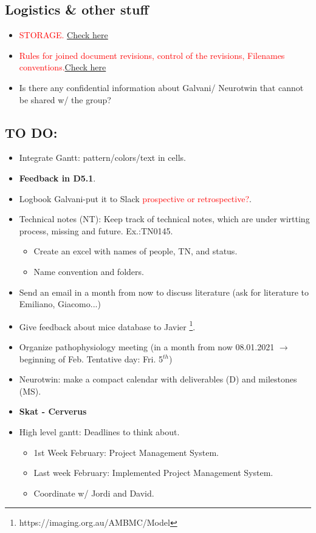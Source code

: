 \subsection{Logistics \&  other stuff}
\begin{itemize}
    \item \textcolor{red}{STORAGE.} \href{https://docs.google.com/document/d/16v9LeHPt3SFdeu1WQeSEbZKQP_1lh1sQ4h05umlxRZ4/edit}{Check here}
    \item \textcolor{red}{Rules for joined document revisions, control of the revisions, Filenames conventions.}\href{https://docs.google.com/document/d/1TGVl9pppeMySwDjRnmjSmvmIVzkaIl4oBJjY9_VCWMU/edit} {Check here}
     \item Is there any confidential information about Galvani/ Neurotwin that cannot be shared w/ the group?

   
\end{itemize}

\subsection{TO DO:}
\begin{itemize}
   \item Integrate Gantt: pattern/colors/text in cells.
    \item \textbf{Feedback in D5.1}.
    \item Logbook Galvani-put it to Slack \textcolor{red}{prospective or retrospective?}.
    \item Technical notes (NT): Keep track of technical notes, which are under wirtting process, missing and future. Ex.:TN0145.
    \begin{itemize}
        \item Create an excel with names of people, TN, and status.
        \item Name convention and folders.
    \end{itemize}
    \item Send an email in a month from now to discuss literature (ask for literature to Emiliano, Giacomo...)
    \item Give feedback about mice database to Javier \footnote{https://imaging.org.au/AMBMC/Model}.
    \item Organize pathophysiology meeting (in a month from now 08.01.2021 $\rightarrow$ beginning of Feb. Tentative day: Fri. 5$^{th}$)
    \item Neurotwin: make a compact calendar with deliverables (D) and milestones (MS).
    \item \textbf{Skat - Cerverus}    
    \item High level gantt: Deadlines to think about.
    \begin{itemize}
        \item 1st Week February: Project Management System.
        \item Last week February: Implemented Project Management System.
        \item Coordinate w/ Jordi and David.
    \end{itemize}
    
\end{itemize}

